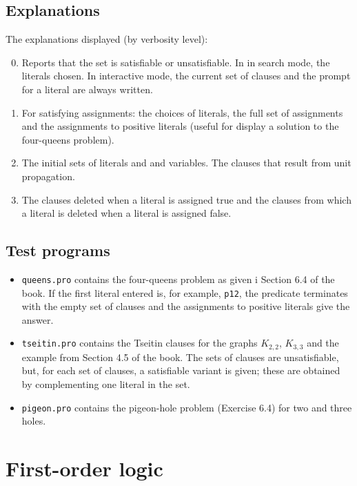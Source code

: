 \documentclass[11pt]{article}
\newcommand*{\p}[1]{\textup{\texttt{#1}}}
\begin{document}
\subsection{Explanations}

The explanations displayed (by verbosity level):
\begin{enumerate}
\setcounter{enumi}{-1}
\item Reports that the set is satisfiable or unsatisfiable. In in search
mode, the literals chosen. In interactive mode, the current set of
clauses and the prompt for a literal are always written.
\item For satisfying assignments: the choices of literals, the full set
of assignments and the assignments to positive literals (useful for
display a solution to the four-queens problem).
\item The initial sets of literals and and variables. The clauses that
result from unit propagation.
\item The clauses deleted when a literal is assigned true and the
clauses from which a literal is deleted when a literal is assigned
false. 
\end{enumerate}

\subsection{Test programs}

\begin{itemize}
\item \p{queens.pro} contains the four-queens problem as given i
Section 6.4 of the book. If the first literal entered is, for example,
\p{p12}, the predicate terminates with the empty set of clauses and the
assignments to positive literals give the answer.
\item \p{tseitin.pro} contains the Tseitin clauses for the graphs
$K_{2,2}$, $K_{3,3}$ and the example from Section 4.5 of the book. The
sets of clauses are unsatisfiable, but, for each set of clauses, a
satisfiable variant is given; these are obtained by complementing one
literal in the set.
\item \p{pigeon.pro} contains the pigeon-hole problem (Exercise 6.4) for
two and three holes.
\end{itemize}


\newpage

\section{First-order logic}
\end{document}
